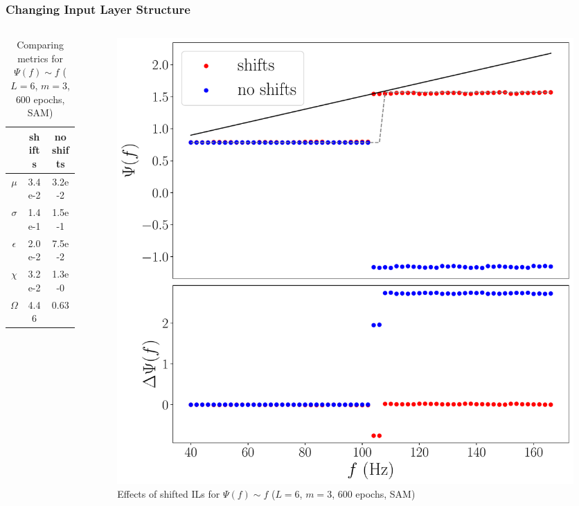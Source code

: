 \documentclass{beamer}
\begin{document}
\begin{frame}
\frametitle{Changing Input Layer Structure}
\begin{columns}
\begin{column}{0.5\textwidth}
\begin{table}
\begin{tabular}{c || c| c }
& shifts & no shifts \\ \hline \hline 
$\mu$ & 3.4e-2 & \alert{3.2e-2}  \\
$\sigma$ & 1.4e-1 & 1.5e-1  \\
$\epsilon$  & 2.0e-2 & 7.5e-2 \\
$\chi$ & 3.2e-2 & 1.3e-0    \\ \hline 
$\Omega$ &   4.46 & 0.63
\end{tabular}
\caption{Comparing metrics for $\Psi(f) \sim f$ ($L=6$, $m=3$, 600 epochs, SAM)}
\end{table}
\end{column}
\begin{column}{0.5\textwidth}
\begin{figure}
\centering 
\includegraphics[width=\textwidth]{im/phase_shift_comp_linear_m3}
\caption{Effects of shifted ILs for $\Psi(f) \sim f$ ($L=6$, $m=3$, 600 epochs, SAM)}
\end{figure}
\end{column}
\end{columns}
\end{frame}
\end{document}
